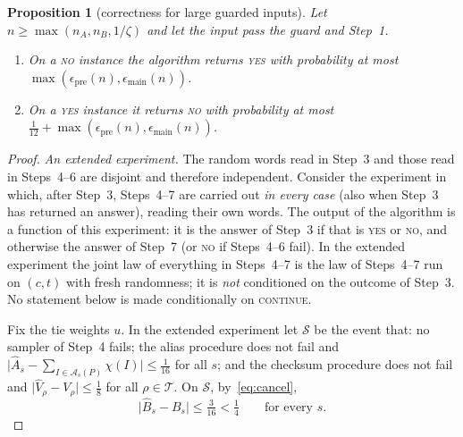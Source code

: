 \documentclass[11pt]{article}
\newtheorem{proposition}[lemma]{Proposition}
\theoremstyle{definition}
\newcommand{\abs}[1]{\lvert #1\rvert}
\newcommand{\cA}{\mathcal A}
\newcommand{\cT}{\mathcal T}
\begin{document}
\begin{proposition}[correctness for large guarded inputs]\label{prop:correct}
Let $n\ge\max(n_A,n_B,1/\zeta)$ and let the input pass the guard and Step~1.
\begin{enumerate}[label=\textup{(\alph*)}]
\item On a \textsc{no} instance the algorithm returns \textsc{yes} with probability at most
$\max(\epsilon_{\mathrm{pre}}(n),\epsilon_{\mathrm{main}}(n))$.
\item On a \textsc{yes} instance it returns \textsc{no} with probability at most
$\tfrac1{12}+\max(\epsilon_{\mathrm{pre}}(n),\epsilon_{\mathrm{main}}(n))$.
\end{enumerate}
\end{proposition}
\begin{proof}
\emph{An extended experiment.} The random words read in Step~3 and those read in Steps~4--6 are disjoint and
therefore independent. Consider the experiment in which, after Step~3, Steps~4--7 are carried out \emph{in every
case} (also when Step~3 has returned an answer), reading their own words. The output of the algorithm is a function
of this experiment: it is the answer of Step~3 if that is \textsc{yes} or \textsc{no}, and otherwise the answer of
Step~7 (or \textsc{no} if Steps~4--6 fail). In the extended experiment the joint law of everything in Steps~4--7 is
the law of Steps~4--7 run on $(c,t)$ with fresh randomness; it is \emph{not} conditioned on the outcome of Step~3.
No statement below is made conditionally on \textsc{continue}.

Fix the tie weights $u$. In the extended experiment let $\mathcal S$ be the event that: no sampler of Step~4 fails;
the alias procedure does not fail and $\abs{\hat A_s-\sum_{I\in\cA_s(P)}\chi(I)}\le\tfrac1{16}$ for all $s$; and the
checksum procedure does not fail and $\abs{\hat V_\rho-V_\rho}\le\tfrac18$ for all $\rho\in\cT$. On $\mathcal S$,
by~\eqref{eq:cancel},
\begin{equation}\label{eq:resid}
 \abs{\hat B_s-B_s}\le\tfrac3{16}<\tfrac14\qquad\text{for every }s .
\end{equation}


\end{proof}
\end{document}
